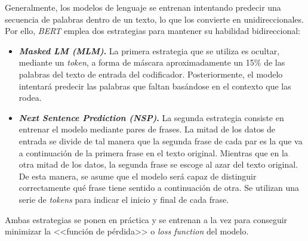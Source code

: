 Generalmente, los modelos de lenguaje se entrenan intentando predecir una secuencia de palabras dentro de un texto, lo que los convierte en unidireccionales. Por ello, \textit{BERT} emplea dos estrategias para mantener su habilidad bidireccional:

\begin{itemize}
    \item \textbf{\textit{Masked LM (MLM)}.} La primera estrategia que se utiliza es ocultar, mediante un \textit{token}, a forma de máscara aproximadamente un 15\% de las palabras del texto de entrada del codificador. Posteriormente, el modelo intentará predecir las palabras que faltan basándose en el contexto que las rodea.
    
    \item \textbf{\textit{Next Sentence Prediction (NSP)}.} La segunda estrategia consiste en entrenar el modelo mediante pares de frases. La mitad de los datos de entrada se divide de tal manera que la segunda frase de cada par es la que va a continuación de la primera frase en el texto original. Mientras que en la otra mitad de los datos, la segunda frase se escoge al azar del texto original. De esta manera, se asume que el modelo será capaz de distinguir correctamente qué frase tiene sentido a continuación de otra. Se utilizan una serie de \textit{tokens} para indicar el inicio y final de cada frase.
\end{itemize}

Ambas estrategias se ponen en práctica y se entrenan a la vez para conseguir minimizar la <<función de pérdida>> o \textit{loss function} del modelo.